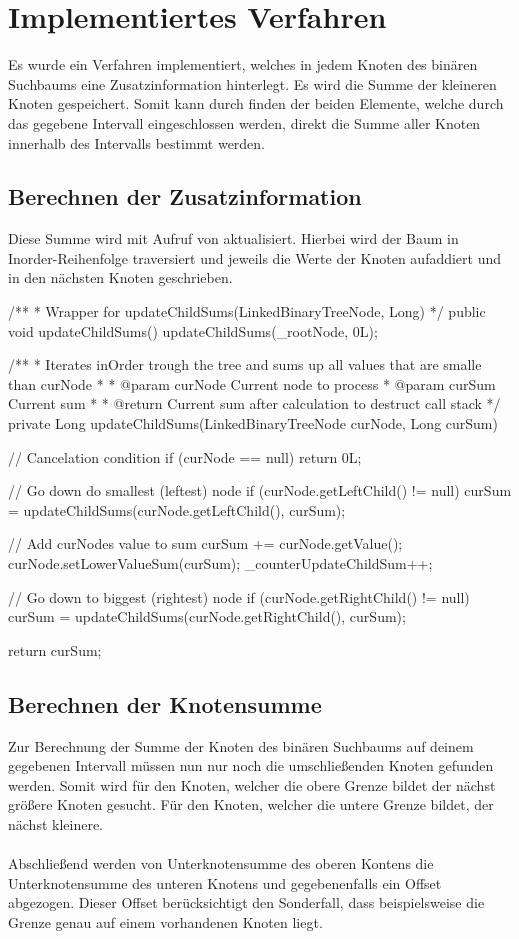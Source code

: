\documentclass[paper=a4, fontsize=12pt]{article}
\begin{document}
\newpage
\section{Implementiertes Verfahren}
Es wurde ein Verfahren implementiert, welches in jedem Knoten des binären Suchbaums eine Zusatzinformation hinterlegt. Es wird die Summe der kleineren Knoten gespeichert. Somit kann durch finden der beiden Elemente, welche durch das gegebene Intervall eingeschlossen werden, direkt die Summe aller Knoten innerhalb des Intervalls bestimmt werden.

\subsection{Berechnen der Zusatzinformation}
Diese Summe wird mit Aufruf von  aktualisiert. Hierbei wird der Baum in Inorder-Reihenfolge traversiert und jeweils die Werte der Knoten aufaddiert und in den nächsten Knoten geschrieben.

\begin{javacode}
/**
 * Wrapper for updateChildSums(LinkedBinaryTreeNode, Long)
 */
public void updateChildSums() {
	updateChildSums(_rootNode, 0L);
}

/**
 * Iterates inOrder trough the tree and sums up all values that are smalle than curNode
 *
 * @param curNode Current node to process
 * @param curSum  Current sum
 *
 * @return Current sum after calculation to destruct call stack
 */
private Long updateChildSums(LinkedBinaryTreeNode curNode, Long curSum) {
	// Cancelation condition
	if (curNode == null) {
		return 0L;
	}
	
	// Go down do smallest (leftest) node
	if (curNode.getLeftChild() != null) {
		curSum = updateChildSums(curNode.getLeftChild(), curSum);
	}
	
	// Add curNodes value to sum
	curSum += curNode.getValue();
	curNode.setLowerValueSum(curSum);
	_counterUpdateChildSum++;
	
	// Go down to biggest (rightest) node
	if (curNode.getRightChild() != null) {
		curSum = updateChildSums(curNode.getRightChild(), curSum);
	}
	
	return curSum;
}
\end{javacode}

\newpage
\subsection{Berechnen der Knotensumme}
Zur Berechnung der Summe der Knoten des binären Suchbaums auf deinem gegebenen Intervall müssen nun nur noch die umschließenden Knoten gefunden werden. Somit wird für den Knoten, welcher die obere Grenze bildet der nächst größere Knoten gesucht. Für den Knoten, welcher die untere Grenze bildet, der nächst kleinere.\\
\\
Abschließend werden von Unterknotensumme des oberen Kontens die Unterknotensumme des unteren Knotens und gegebenenfalls ein Offset abgezogen. Dieser Offset berücksichtigt den Sonderfall, dass beispielsweise die Grenze genau auf einem vorhandenen Knoten liegt.
\end{document}
